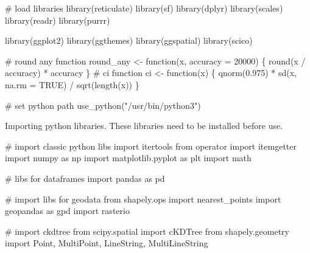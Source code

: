 \documentclass[]{article}
\newenvironment{Shaded}{}{}
\newcommand{\CommentTok}[1]{\textcolor[rgb]{0.00,0.50,0.00}{#1}}
\newcommand{\ControlFlowTok}[1]{\textcolor[rgb]{0.00,0.00,1.00}{#1}}
\newcommand{\DataTypeTok}[1]{#1}
\newcommand{\DecValTok}[1]{#1}
\newcommand{\FloatTok}[1]{#1}
\newcommand{\ImportTok}[1]{#1}
\newcommand{\KeywordTok}[1]{\textcolor[rgb]{0.00,0.00,1.00}{#1}}
\newcommand{\NormalTok}[1]{#1}
\newcommand{\OperatorTok}[1]{#1}
\newcommand{\OtherTok}[1]{\textcolor[rgb]{1.00,0.25,0.00}{#1}}
\newcommand{\StringTok}[1]{\textcolor[rgb]{0.00,0.50,0.50}{#1}}
\begin{document}
\begin{Shaded}
\begin{Highlighting}[]
\CommentTok{# load libraries}
\KeywordTok{library}\NormalTok{(reticulate)}
\KeywordTok{library}\NormalTok{(sf)}
\KeywordTok{library}\NormalTok{(dplyr)}
\KeywordTok{library}\NormalTok{(scales)}
\KeywordTok{library}\NormalTok{(readr)}
\KeywordTok{library}\NormalTok{(purrr)}

\KeywordTok{library}\NormalTok{(ggplot2)}
\KeywordTok{library}\NormalTok{(ggthemes)}
\KeywordTok{library}\NormalTok{(ggspatial)}
\KeywordTok{library}\NormalTok{(scico)}

\CommentTok{# round any function}
\NormalTok{round_any <-}\StringTok{ }\ControlFlowTok{function}\NormalTok{(x, }\DataTypeTok{accuracy =} \DecValTok{20000}\NormalTok{) \{}
  \KeywordTok{round}\NormalTok{(x }\OperatorTok{/}\StringTok{ }\NormalTok{accuracy) }\OperatorTok{*}\StringTok{ }\NormalTok{accuracy}
\NormalTok{\}}
\CommentTok{# ci function}
\NormalTok{ci <-}\StringTok{ }\ControlFlowTok{function}\NormalTok{(x) \{}
  \KeywordTok{qnorm}\NormalTok{(}\FloatTok{0.975}\NormalTok{) }\OperatorTok{*}\StringTok{ }\KeywordTok{sd}\NormalTok{(x, }\DataTypeTok{na.rm =} \OtherTok{TRUE}\NormalTok{) }\OperatorTok{/}\StringTok{ }\KeywordTok{sqrt}\NormalTok{(}\KeywordTok{length}\NormalTok{(x))}
\NormalTok{\}}

\CommentTok{# set python path}
\KeywordTok{use_python}\NormalTok{(}\StringTok{"/usr/bin/python3"}\NormalTok{)}
\end{Highlighting}
\end{Shaded}

Importing python libraries. These libraries need to be installed before use.

\begin{Shaded}
\begin{Highlighting}[]
\CommentTok{# import classic python libs}
\ImportTok{import}\NormalTok{ itertools}
\ImportTok{from}\NormalTok{ operator }\ImportTok{import}\NormalTok{ itemgetter}
\ImportTok{import}\NormalTok{ numpy }\ImportTok{as}\NormalTok{ np}
\ImportTok{import}\NormalTok{ matplotlib.pyplot }\ImportTok{as}\NormalTok{ plt}
\ImportTok{import}\NormalTok{ math}

\CommentTok{# libs for dataframes}
\ImportTok{import}\NormalTok{ pandas }\ImportTok{as}\NormalTok{ pd}

\CommentTok{# import libs for geodata}
\ImportTok{from}\NormalTok{ shapely.ops }\ImportTok{import}\NormalTok{ nearest_points}
\ImportTok{import}\NormalTok{ geopandas }\ImportTok{as}\NormalTok{ gpd}
\ImportTok{import}\NormalTok{ rasterio}

\CommentTok{# import ckdtree}
\ImportTok{from}\NormalTok{ scipy.spatial }\ImportTok{import}\NormalTok{ cKDTree}
\ImportTok{from}\NormalTok{ shapely.geometry }\ImportTok{import}\NormalTok{ Point, MultiPoint, LineString, MultiLineString}
\end{Highlighting}
\end{Shaded}
\end{document}
